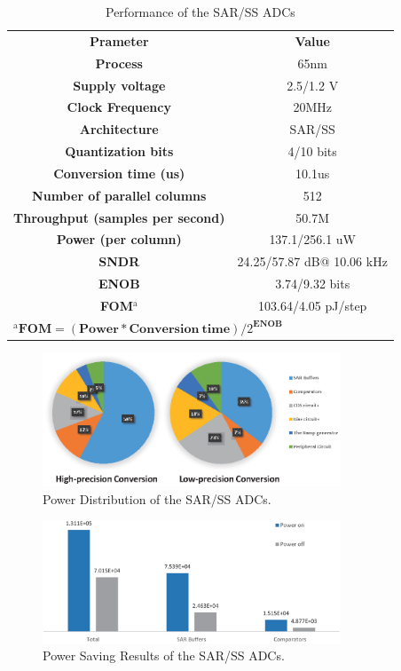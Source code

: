 \documentclass[conference]{IEEEtran}
\begin{document}
\begin{table}[htbp]
	\caption{Performance of the SAR/SS ADCs}
	\begin{center}
		\begin{tabular}{|c|c|}
			\hline
			\textbf{Prameter}& \textbf{Value} \\
			\hhline{|==|}
			\textbf{Process}& 65nm \\
			\hline 
			\textbf{Supply voltage}& 2.5/1.2 V \\
			\hline
			\textbf{Clock Frequency}&	20MHz \\
			\hline
			\textbf{Architecture}&	SAR/SS \\
			\hline
			\textbf{Quantization bits}&	4/10 bits \\
			\hline
			\textbf{Conversion time (us)}&	10.1us \\
			\hline
			\textbf{Number of parallel columns}&	512 \\
			\hline
			\textbf{Throughput (samples per second)}&	50.7M \\ 
			\hline
			\textbf{Power (per column)}&	137.1/256.1 uW \\
			\hline
			\textbf{SNDR}& 24.25/57.87 dB@ 10.06 kHz \\
			\hline
			\textbf{ENOB}& 3.74/9.32 bits \\
			\hline
			\textbf{FOM$^{\mathrm{a}}$}& 103.64/4.05 pJ/step\\
			\hline
			\multicolumn{2}{l}{$^{\mathrm{a}}\textbf{FOM}=(\textbf{Power}\ast \textbf{Conversion}\ \textbf{time})/2^{\textbf{ENOB}}$ }	    
		\end{tabular}
		\label{tab2}
	\end{center}
\end{table}

\begin{figure}[htbp]
	\centerline{\includegraphics[width=3.5in]{./Figures/SARResults1.eps}}
	\caption{Power Distribution of the SAR/SS ADCs.}
	\label{SARresults1}
\end{figure} 

\begin{figure}[htbp]
	\centerline{\includegraphics[width=3.5in]{./Figures/SARResults2.eps}}
	\caption{Power Saving Results of the SAR/SS ADCs.}
	\label{SARresults2}
\end{figure} 
\end{document}
